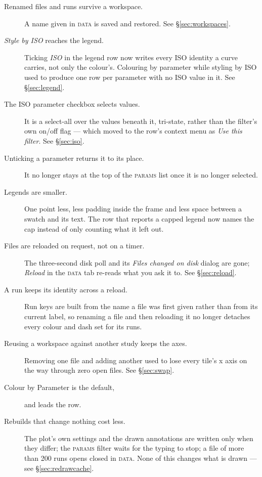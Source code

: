 \documentclass[11pt,a4paper,oneside]{report}
\newcommand{\tab}[1]{\textsc{#1}}
\begin{document}
\begin{description}
\item[Renamed files and runs survive a workspace.] A name given in \tab{data} is saved
  and restored. See \S\ref{sec:workspaces}.
\item[\emph{Style by ISO} reaches the legend.] Ticking \emph{ISO} in the legend row now
  writes every ISO identity a curve carries, not only the colour's. Colouring
  by parameter while styling by ISO used to produce one row per parameter with
  no ISO value in it. See \S\ref{sec:legend}.
\item[The ISO parameter checkbox selects values.] It is a select-all over the values
  beneath it, tri-state, rather than the filter's own on/off flag --- which
  moved to the row's context menu as \emph{Use this filter}. See \S\ref{sec:iso}.
\item[Unticking a parameter returns it to its place.] It no longer stays at the top of
  the \tab{params} list once it is no longer selected.
\item[Legends are smaller.] One point less, less padding inside the frame and less
  space between a swatch and its text. The row that reports a capped legend
  now names the cap instead of only counting what it left out.
\item[Files are reloaded on request, not on a timer.] The three-second disk poll and
  its \emph{Files changed on disk} dialog are gone; \emph{Reload} in the
  \tab{data} tab re-reads what you ask it to. See \S\ref{sec:reload}.
\item[A run keeps its identity across a reload.] Run keys are built from the name a
  file was first given rather than from its current label, so renaming a file
  and then reloading it no longer detaches every colour and dash set for its
  runs.
\item[Reusing a workspace against another study keeps the axes.] Removing one file and
  adding another used to lose every tile's x axis on the way through zero open
  files. See \S\ref{sec:swap}.
\item[Colour by Parameter is the default,] and leads the row.
\item[Rebuilds that change nothing cost less.] The plot's own settings and the drawn
  annotations are written only when they differ; the \tab{params} filter waits
  for the typing to stop; a file of more than 200 runs opens closed in
  \tab{data}. None of this changes what is drawn --- see \S\ref{sec:redrawcache}.
\end{description}
\end{document}
